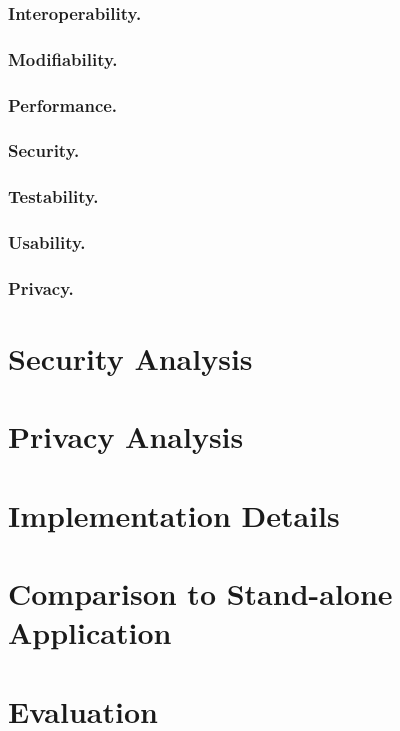 \documentclass[letterpaper]{article}
\begin{document}
\subsubsection{Interoperability.}

\subsubsection{Modifiability.}

\subsubsection{Performance.}

\subsubsection{Security.}

\subsubsection{Testability.}

\subsubsection{Usability.}

\subsubsection{Privacy.}


\section{Security Analysis}

\section{Privacy Analysis}

\section{Implementation Details}

\section{Comparison to Stand-alone Application}

\section{Evaluation}
\end{document}
